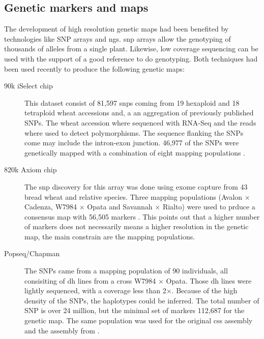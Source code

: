 \subsection{Genetic markers and maps}

The development of high resolution genetic maps had been benefited by technologies like SNP arrays and \gls{ngs}. 
\gls{snp} arrays allow the genotyping of thousands of alleles from a single plant. Likewise, low coverage sequencing can be used with the support of a good reference to do genotyping. 
Both techniques had been used recently to produce the following genetic maps: 

\begin{description}
\item[90k iSelect chip] This dataset consist of 81,597 \glspl{snp} coming from 19 hexaploid and 18 tetraploid wheat accessions and, a an aggregation of previously published SNPs. The wheat accession where sequenced with RNA-Seq and the reads where used to detect polymorphisms. The sequence flanking the SNPs come may include the intron-exon junction. 46,977 of the SNPs were genetically mapped with a combination of eight mapping populations \citep{Wang2014}. 
\item[820k Axiom chip] The \gls{snp} discovery for this array was done using exome capture from 43 bread wheat and relative species. Three mapping populations (Avalon $\times$ Cadenza, W7984 $\times$ Opata and Savannah $\times$  Rialto) were used to prduce a consensus map with 56,505 markers \citep{Allen2016,Winfield2016}. This points out that a higher number of markers does not necessarily means a higher resolution in the genetic map, the main constrain are the mapping populations.  
\item[Popseq/Chapman] The SNPs came from a mapping population of 90 individuals, all consisiting of \gls{dh} lines from a cross W7984 $\times$ Opata. Those \gls{dh} lines were lightly sequenced, with a coverage less than 2$\times$. Because of the high density of the SNPs, the haplotypes could be inferred. The total number of SNP is over 24 million, but the minimal set of markers 112,687 for the genetic map. The same population was used for the original \gls{css} assembly \citep{Mayer2014} and the assembly from \citet{Chapman2015}. 
\end{description}




